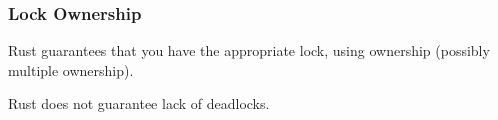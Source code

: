 \begin{frame}
\frametitle{Lock Ownership}

Rust guarantees that you have the appropriate lock, using ownership (possibly multiple ownership).


Rust does not guarantee lack of deadlocks.


\end{frame}






